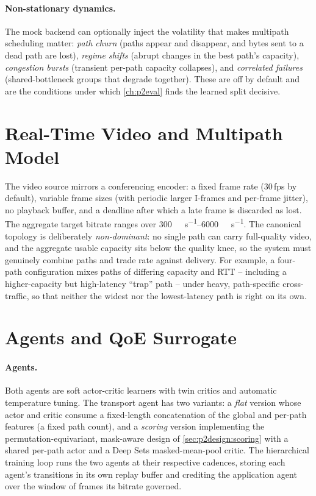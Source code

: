 \paragraph{Non-stationary dynamics.} The mock backend can optionally inject the volatility that makes
multipath scheduling matter: \emph{path churn} (paths appear and disappear, and bytes sent to a dead path
are lost), \emph{regime shifts} (abrupt changes in the best path's capacity), \emph{congestion bursts}
(transient per-path capacity collapses), and \emph{correlated failures} (shared-bottleneck groups that
degrade together). These are off by default and are the conditions under which \cref{ch:p2eval} finds the
learned split decisive.

\section{Real-Time Video and Multipath Model}
\label{sec:p2impl:rt}

The video source mirrors a conferencing encoder: a fixed frame rate (30\,fps by default), variable
frame sizes (with periodic larger I-frames and per-frame jitter), no playback buffer, and a deadline
after which a late frame is discarded as lost. The aggregate target bitrate ranges over
\SIrange{300}{6000}{\kilo\bit\per\second}. The canonical topology is deliberately \emph{non-dominant}: no
single path can carry full-quality video, and the aggregate usable capacity sits below the quality knee,
so the system must genuinely combine paths and trade rate against delivery. For example, a four-path
configuration mixes paths of differing capacity and RTT -- including a higher-capacity but high-latency
``trap'' path -- under heavy, path-specific cross-traffic, so that neither the widest nor the
lowest-latency path is right on its own.

\section{Agents and QoE Surrogate}
\label{sec:p2impl:agents}

\paragraph{Agents.} Both agents are soft actor-critic learners with twin critics and automatic
temperature tuning. The transport agent has two variants: a \emph{flat} version whose actor and critic
consume a fixed-length concatenation of the global and per-path features (a fixed path count), and a
\emph{scoring} version implementing the permutation-equivariant, mask-aware design of
\cref{sec:p2design:scoring} with a shared per-path actor and a Deep Sets masked-mean-pool critic. The
hierarchical training loop runs the two agents at their respective cadences, storing each agent's
transitions in its own replay buffer and crediting the application agent over the window of frames its
bitrate governed.

